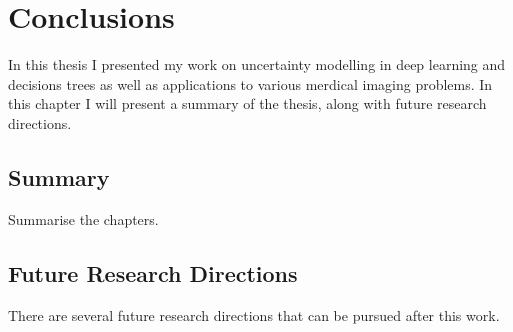 \chapter{Conclusions} \label{chapter:conclusions}

In this thesis I presented my work on uncertainty modelling in deep learning and decisions trees as well as applications to various merdical imaging problems. In this chapter I will present a summary of the thesis, along with future research directions. 

\section{Summary}
\label{sec:conSum}
Summarise the chapters. 

\section{Future Research Directions}
There are several future research directions that can be pursued after this work.
